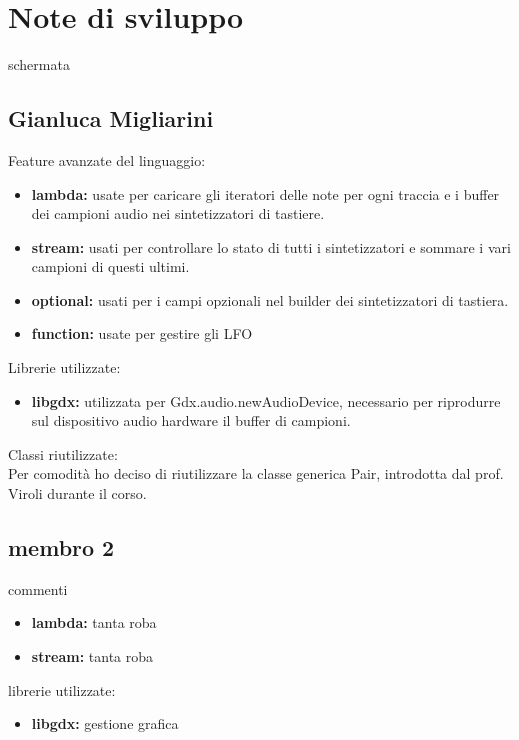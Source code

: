 \documentclass[a4paper,12pt]{report}
\begin{document}
\section{Note di sviluppo}
schermata
\newpage

\subsection{Gianluca Migliarini}
Feature avanzate del linguaggio:
\begin{itemize}
	\item \textbf{lambda:} usate per caricare gli iteratori delle note per ogni traccia e i buffer dei campioni audio nei sintetizzatori di tastiere.
	\item \textbf{stream:} usati per controllare lo stato di tutti i sintetizzatori e sommare i vari campioni di questi ultimi.
	\item \textbf{optional:} usati per i campi opzionali nel builder dei sintetizzatori di tastiera. 
	\item \textbf{function:} usate per gestire gli LFO
\end{itemize}
Librerie utilizzate:
\begin{itemize}
	\item \textbf{libgdx:} utilizzata per Gdx.audio.newAudioDevice, necessario per riprodurre sul dispositivo audio hardware il buffer di campioni.
\end{itemize}
Classi riutilizzate: \\
Per comodità ho deciso di riutilizzare la classe generica Pair, introdotta dal prof. Viroli durante il corso.
\newpage

\subsection{membro 2}
commenti
\begin{itemize}
	\item \textbf{lambda:} tanta roba
	\item \textbf{stream:} tanta roba
\end{itemize}
librerie utilizzate:
\begin{itemize}
	\item \textbf{libgdx:} gestione grafica
\end{itemize}
\newpage
\end{document}
